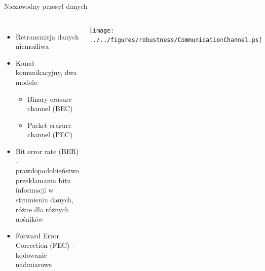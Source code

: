 \documentclass[compress,red]{beamer}
\begin{document}
\begin{frame}{Niezawodny przesył danych}

  \begin{columns}[c]

      \begin{itemize}
	\item Retransmisja danych niemożliwa
	\item Kanał komunikacyjny, dwa modele:
	\begin{itemize}
	  \item Binary erasure channel (BEC)
	  \item Packet erasure channel (PEC)
	\end{itemize}
	\item Bit error rate (BER) - prawdopodobieństwo przekłamania bitu informacji w strumieniu danych, 
	      różne dla różnych nośników
	\item Forward Error Correction (FEC) - kodowanie nadmiarowe
      \end{itemize}

      \vspace{2cm}


      \begin{center}
      \texttt{[image: ../../figures/robustness/CommunicationChannel.ps]}
      \end{center}

      \vspace{2cm}

  \end{columns}

\end{frame}
\end{document}
